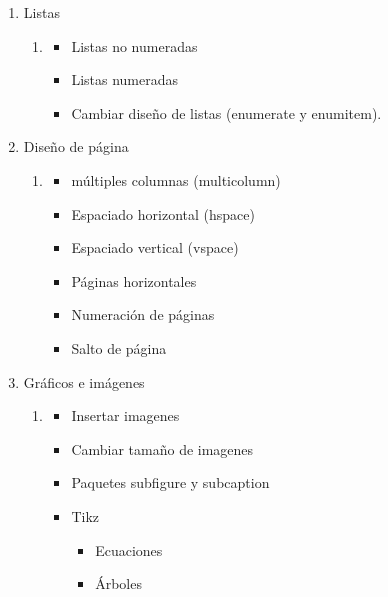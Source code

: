 \documentclass[12pt]{article}
\begin{document}
\begin{enumerate}[label={\bfseries\arabic*.}]
\begin{enumerate}[start=1,label={\large\bfseries Módulo\ \arabic*:},leftmargin=2cm]
\begin{enumerate}[start=3,label={\bfseries Semana\ \arabic*:},leftmargin=1cm,rightmargin=.1\linewidth]
\begin{itemize}
        \end{itemize}
    \end{enumerate}
    \item Listas 
    \begin{enumerate}[start=4,label={\bfseries Semana\ \arabic*:},leftmargin=1cm,rightmargin=.1\linewidth]
        \item
        \begin{itemize}
            \item Listas no numeradas
            \item Listas numeradas
            \item Cambiar diseño de listas (enumerate y enumitem).
        \end{itemize}
    \end{enumerate}
    \item Diseño de página
    \begin{enumerate}[start=5,label={\bfseries Semana\ \arabic*:},leftmargin=1cm,rightmargin=.1\linewidth]
        \item
        \begin{itemize}
            \item múltiples columnas (multicolumn)
            \item Espaciado horizontal (hspace)
            \item Espaciado vertical (vspace)
            \item Páginas horizontales
            \item Numeración de páginas
            \item Salto de página
        \end{itemize}
    \end{enumerate}
    \item Gráficos e imágenes
    \begin{enumerate}[start=6,label={\bfseries Semana\ \arabic*:},leftmargin=1cm,rightmargin=.1\linewidth]
        \item
        \begin{itemize}
            \item Insertar imagenes
            \item Cambiar tamaño de imagenes
            \item Paquetes subfigure y subcaption
            \item Tikz
            \begin{itemize}
                \item Ecuaciones
                \item Árboles

\end{itemize}
\end{itemize}
\end{enumerate}
\end{enumerate}
\end{enumerate}
\end{document}
